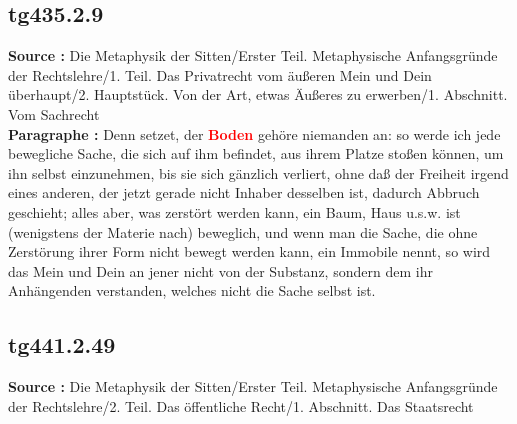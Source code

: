 \documentclass[a4paper,12pt,twoside]{book}
\newcommand{\match}[1]{\textcolor{red}{\textbf{#1}}}
\begin{document}
	\subsection*{tg435.2.9} 
	\textbf{Source : }Die Metaphysik der Sitten/Erster Teil. Metaphysische Anfangsgründe der Rechtslehre/1. Teil. Das Privatrecht vom äußeren Mein und Dein überhaupt/2. Hauptstück. Von der Art, etwas Äußeres zu erwerben/1. Abschnitt. Vom Sachrecht\\  
	
	\textbf{Paragraphe : }Denn setzet, der \match{Boden} gehöre niemanden an: so werde ich jede bewegliche Sache, die sich auf ihm befindet, aus ihrem Platze stoßen können, um ihn selbst einzunehmen, bis sie sich gänzlich verliert, ohne daß der Freiheit irgend eines anderen, der jetzt gerade nicht Inhaber desselben ist, dadurch Abbruch geschieht; alles aber, was zerstört werden kann, ein Baum, Haus u.s.w. ist (wenigstens der Materie nach) beweglich, und wenn man die Sache, die ohne Zerstörung ihrer Form nicht bewegt werden kann, ein Immobile nennt, so wird das Mein und Dein an jener nicht von der Substanz, sondern dem ihr Anhängenden verstanden, welches nicht die Sache selbst ist. 
	
	\subsection*{tg441.2.49} 
	\textbf{Source : }Die Metaphysik der Sitten/Erster Teil. Metaphysische Anfangsgründe der Rechtslehre/2. Teil. Das öffentliche Recht/1. Abschnitt. Das Staatsrecht\\  
	
\end{document}
